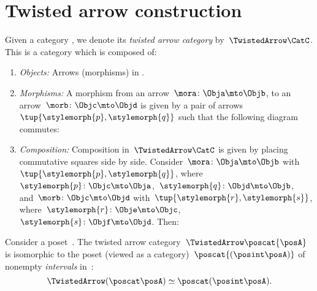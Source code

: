 
\section{Twisted arrow construction}
\begin{ctdefinition}
    \label{def:twisted-arrow-category}
    \label{def:twisted-arrow}
    Given a category \CatC, we denote its \emph{twisted arrow category} by~$\TwistedArrow\CatC$.
    This is a category which is composed of:
    \begin{enumerate}
        \item \emph{Objects:} Arrows (morphisms) in \CatC.
        \item \emph{Morphisms:}
              A morphism from an arrow~$\mora\colon \Obja \mto \Objb $, to an arrow~$\morb\colon \Objc \mto \Objd$ is given by a pair of arrows~$\tup{\stylemorph{p},\stylemorph{q}}$ such that the following diagram commutes:
        \item \emph{Composition:} Composition in~$\TwistedArrow\CatC$ is given by placing commutative squares side by side.
              Consider~$\mora\colon \Obja \mto \Objb$ with~$\tup{\stylemorph{p},\stylemorph{q}}$, where~$\stylemorph{p}\colon \Objc\mto \Obja$,~$\stylemorph{q}\colon \Objd \mto \Objb$, and~$\morb\colon \Objc \mto \Objd$ with~$\tup{\stylemorph{r},\stylemorph{s}}$, where~$\stylemorph{r}\colon \Obje\mto \Objc$,~$\stylemorph{s}\colon \Objf \mto \Objd$.
              Then:
    \end{enumerate}
\end{ctdefinition}


\begin{example}
    \label{exa:twisted-arrow-poset}
    Consider a poset~\posA.
    The twisted arrow category~$\TwistedArrow \poscat{\posA}$ is isomorphic to the poset (viewed as a category)~$\poscat{\left(\posint\posA\right)}$ of nonempty \emph{intervals} in~\posA:
    \begin{equation}
        \TwistedArrow (\poscat \posA) \simeq \poscat (\posint\posA) .
    \end{equation}
\end{example}

